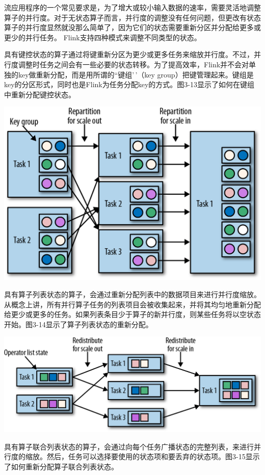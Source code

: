 \documentclass[cn,11pt,chinese]{elegantbook}
\begin{document}
流应用程序的一个常见要求是，为了增大或较小输入数据的速率，需要灵活地调整算子的并行度。对于无状态算子而言，并行度的调整没有任何问题，但更改有状态算子的并行度显然就没那么简单了，因为它们的状态需要重新分区并分配给更多或更少的并行任务。
Flink支持四种模式来调整不同类型的状态。

具有键控状态的算子通过将键重新分区为更少或更多任务来缩放并行度。不过，并行度调整时任务之间会有一些必要的状态转移。为了提高效率，Flink并不会对单独的key做重新分配，而是用所谓的``键组'\,'（key
group）把键管理起来。键组是key的分区形式，同时也是Flink为任务分配key的方式。图3-13显示了如何在键组中重新分配键控状态。

\includegraphics{images/spaf_0313.png}

具有算子列表状态的算子，会通过重新分配列表中的数据项目来进行并行度缩放。从概念上讲，所有并行算子任务的列表项目会被收集起来，并将其均匀地重新分配给更少或更多的任务。如果列表条目少于算子的新并行度，则某些任务将以空状态开始。图3-14显示了算子列表状态的重新分配。

\includegraphics{images/spaf_0314.png}

具有算子联合列表状态的算子，会通过向每个任务广播状态的完整列表，来进行并行度的缩放。然后，任务可以选择要使用的状态项和要丢弃的状态项。图3-15显示了如何重新分配算子联合列表状态。
\end{document}
